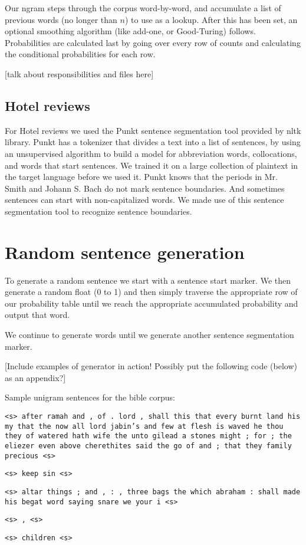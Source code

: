 \documentclass{article}
\begin{document}
Our ngram steps through the corpus word-by-word, and accumulate a list of previous words (no longer than $n$) to use as a lookup. After this has been set, an optional smoothing algorithm (like add-one, or Good-Turing) follows. Probabilities are calculated last by going over every row of counts and calculating the conditional probabilities for each row.\par

[talk about responsibilities and files here]\par
[talk about the order in which unk, smoothing, right-to-left is done, etc]

\subsection{Hotel reviews}
For Hotel reviews we used the Punkt sentence segmentation tool provided by nltk library. Punkt has a tokenizer that divides a text into a list of sentences, by using an unsupervised algorithm to build a model for abbreviation words, collocations, and words that start sentences. We trained it on a large collection of plaintext in the target language before we used it. Punkt knows that the periods in Mr. Smith and Johann S. Bach do not mark sentence boundaries. And sometimes sentences can start with non-capitalized words. We made use of this sentence segmentation tool to recognize sentence boundaries. 

\section{Random sentence generation}
To generate a random sentence we start with a sentence start marker. We then generate a random float (0 to 1)
and then simply traverse the appropriate row of our probability table until we reach the appropriate accumulated probability and output that word.\par

We continue to generate words until we generate another sentence segmentation marker.

[Include examples of generator in action! Possibly put the following code (below) as an appendix?]

\iffalse
\vspace{2mm}
\setlength{\parindent}{0cm}
\newcommand\npar{\par\smallskip}
Sample unigram sentences for the bible corpus:\npar
\texttt{<s> after ramah and , of . lord , shall this that every burnt land his my that the now all lord jabin's and few at flesh is waved he thou they of watered hath wife the unto gilead a stones might ; for ; the eliezer even above cherethites said the go of and ; that they family precious <s>}\npar
\texttt{<s> keep sin <s>}\npar
\texttt{<s> altar things ; and , : , three bags the which abraham : shall made his begat word saying snare we your i <s>}\npar
\texttt{<s> , <s>}\npar
\texttt{<s> children <s>}\npar
\bigskip
\end{document}
